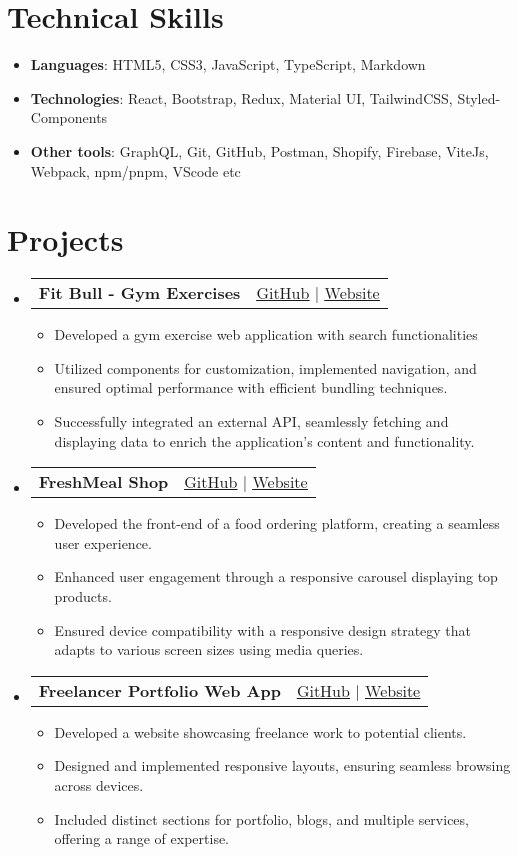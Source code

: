 \documentclass[letterpaper,11pt]{article}
\makeatletter
\newcommand{\resumeItem}[1]{
  \item\small{
    {#1 \vspace{-2pt}}
  }
}
\newcommand{\resumeProjectHeading}[2]{
    \item
    \begin{tabular*}{0.97\textwidth}{l@{\extracolsep{\fill}}r}
      \small#1 & #2 \\
    \end{tabular*}\vspace{-7pt}
}
\newcommand{\resumeSubHeadingListStart}{\begin{itemize}[leftmargin=0.15in, label={}]}
\newcommand{\resumeSubHeadingListEnd}{\end{itemize}}
\newcommand{\resumeItemListStart}{\begin{itemize}}
\newcommand{\resumeItemListEnd}{\end{itemize}\vspace{-5pt}}
\makeatother
\begin{document}
\section{Technical Skills}
\resumeItemListStart
            \resumeItem{\textbf{Languages}{: HTML5, CSS3, JavaScript, TypeScript, Markdown}}
            \resumeItem{\textbf{Technologies}{: React, Bootstrap, Redux, Material UI, TailwindCSS, Styled-Components}}
            \resumeItem{\textbf{Other tools}{: GraphQL, Git, GitHub, Postman, Shopify, Firebase, ViteJs, Webpack, npm/pnpm,  VScode etc}}
\resumeItemListEnd


\section{Projects}
    \resumeSubHeadingListStart
        \resumeProjectHeading
          {\textbf{Fit Bull - Gym Exercises}}
          {{ {\small {\faGithub} \href{https://github.com/dushmanta05/fit-bull}{\underline{GitHub}}} $|$ {\small {\faGlobe} \href{https://fit-bull.netlify.app/}{{\underline{Website}}}}}}
          \resumeItemListStart
            \resumeItem{Developed a gym exercise web application with search functionalities}
            \resumeItem{Utilized components for customization, implemented navigation, and ensured optimal performance with efficient bundling techniques.}
            \resumeItem{Successfully integrated an external API, seamlessly fetching and displaying data to enrich the application's content and functionality.}
          \resumeItemListEnd
        \resumeProjectHeading
          {\textbf{FreshMeal Shop}}
          {{ {\small {\faGithub} \href{https://github.com/dushmanta05/fresh-kart}{\underline{GitHub}}} $|$ {\small {\faGlobe} \href{https://fresh-kart.vercel.app/}{{\underline{Website}}}}}}
          \resumeItemListStart
            \resumeItem{Developed the front-end of a food ordering platform, creating a seamless user experience.}
            \resumeItem{Enhanced user engagement through a responsive carousel displaying top products.}
            \resumeItem{ Ensured device compatibility with a responsive design strategy that adapts to various screen sizes using media queries.}
          \resumeItemListEnd
      \resumeProjectHeading
          {\textbf{Freelancer Portfolio Web App}}
          {{ {\small {\faGithub} \href{https://github.com/dushmanta05/byteverse}{\underline{GitHub}}} $|$ {\small {\faGlobe} \href{https://byteverse.vercel.app/}{{\underline{Website}}}}}}
          \resumeItemListStart
            \resumeItem{Developed a website showcasing freelance work to potential clients.}
            \resumeItem{Designed and implemented responsive layouts, ensuring seamless browsing across devices.}
            \resumeItem{ Included distinct sections for portfolio, blogs, and multiple services, offering a range of expertise.}
          \resumeItemListEnd
    \resumeSubHeadingListEnd
\end{document}
